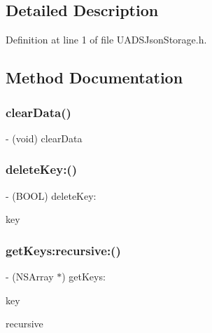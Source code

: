 \subsection{Detailed Description}


Definition at line 1 of file U\+A\+D\+S\+Json\+Storage.\+h.



\subsection{Method Documentation}
\mbox{\label{interface_u_a_d_s_json_storage_aca481b6fe48e31c6c777faaf9c398ddb}} 
\subsubsection{\texorpdfstring{clearData()}{clearData()}}
{\footnotesize\ttfamily -\/ (void) clear\+Data \begin{DoxyParamCaption}{ }\end{DoxyParamCaption}}

\mbox{\label{interface_u_a_d_s_json_storage_a6bf047b98773df17c4c7204f4f163c3e}} 
\subsubsection{\texorpdfstring{deleteKey:()}{deleteKey:()}}
{\footnotesize\ttfamily -\/ (B\+O\+OL) delete\+Key\+: \begin{DoxyParamCaption}\item[{(N\+S\+String $\ast$)}]{key }\end{DoxyParamCaption}}

\mbox{\label{interface_u_a_d_s_json_storage_adaa268af405a0a0a1e33ae2097e84229}} 
\subsubsection{\texorpdfstring{getKeys:recursive:()}{getKeys:recursive:()}}
{\footnotesize\ttfamily -\/ (N\+S\+Array $\ast$) get\+Keys\+: \begin{DoxyParamCaption}\item[{(N\+S\+String $\ast$)}]{key }\item[{recursive\+:(B\+O\+OL)}]{recursive }\end{DoxyParamCaption}}

